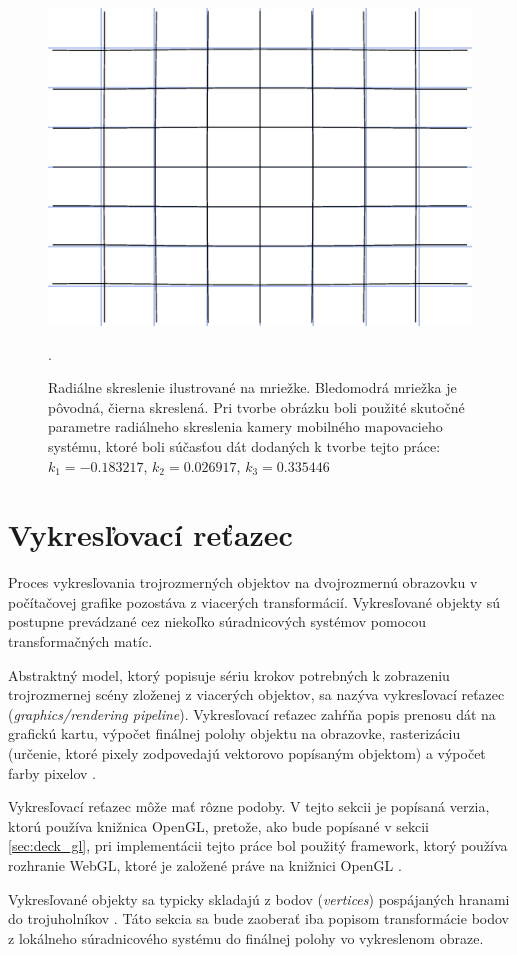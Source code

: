 \begin{figure}[t]
    \centering
    \includegraphics[width=0.6\linewidth]{text_prace/obrazky-figures/radialne_skreslenie.png}
    \caption{Radiálne skreslenie ilustrované na mriežke. Bledomodrá mriežka je pôvodná, čierna skreslená. Pri tvorbe obrázku boli použité skutočné parametre radiálneho skreslenia kamery mobilného mapovacieho systému, ktoré boli súčasťou dát dodaných k tvorbe tejto práce: $k_1 = -0.183217$, $k_2 = 0.026917$, $k_3 = 0.335446$}.
    \label{fig:radialne_skreslenie}
\end{figure}

\section{Vykresľovací reťazec}

Proces vykresľovania trojrozmerných objektov na dvojrozmernú obrazovku v počítačovej grafike pozostáva z viacerých transformácií. Vykresľované objekty sú postupne prevádzané cez niekoľko súradnicových systémov pomocou transformačných matíc.

Abstraktný model, ktorý popisuje sériu krokov potrebných k zobrazeniu trojrozmernej scény zloženej z viacerých objektov, sa nazýva vykresľovací reťazec (\emph{graphics/rendering pipeline}). Vykresľovací reťazec zahŕňa popis prenosu dát na grafickú kartu, výpočet finálnej polohy objektu na obrazovke, rasterizáciu (určenie, ktoré pixely zodpovedajú vektorovo popísaným objektom) a výpočet farby pixelov \cite{stemkoski_graphics}.

Vykresľovací reťazec môže mať rôzne podoby. V tejto sekcii je popísaná verzia, ktorú používa knižnica OpenGL, pretože, ako bude popísané v sekcii \ref{sec:deck_gl}, pri implementácii tejto práce bol použitý framework, ktorý používa rozhranie WebGL, ktoré je založené práve na knižnici OpenGL \cite{webgl_overview}.

Vykresľované objekty sa typicky skladajú z bodov (\emph{vertices}) pospájaných hranami do trojuholníkov \cite{stemkoski_graphics}. Táto sekcia sa bude zaoberať iba popisom transformácie bodov z lokálneho súradnicového systému do finálnej polohy vo vykreslenom obraze.

